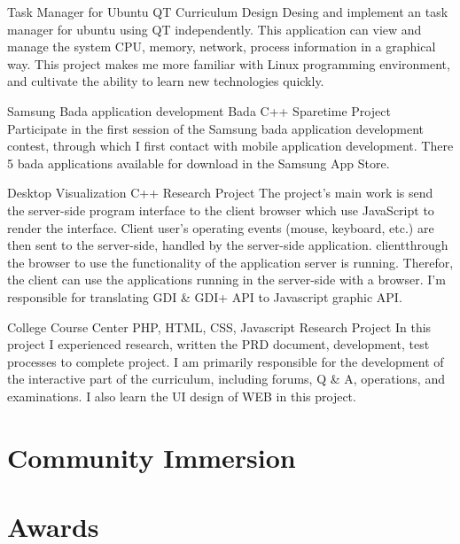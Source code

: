 \documentclass[11pt,a4paper]{moderncv}
\begin{document}
\vspace*{0.2\baselineskip}
{Task Manager for Ubuntu}
{QT}
{Curriculum Design}{}
{
Desing and implement an task manager for ubuntu using QT independently. This application can view and manage
the system CPU, memory, network, process information  in a graphical way. This project makes me more familiar
with Linux programming environment, and cultivate the ability to learn new technologies quickly.
}

\vspace*{0.2\baselineskip}
{Samsung Bada application development}
{Bada C++}
{Sparetime Project}{}
{Participate in the first session of the Samsung bada application development contest, through which I first contact with mobile
application development. There 5 bada applications available for download in the Samsung App Store.
}

\vspace*{0.2\baselineskip}
{Desktop Visualization}
{C++}
{Research Project}{}
{The project's main work is send the server-side program interface to the client browser which use JavaScript to render the interface. 
Client user's operating events (mouse, keyboard, etc.) are then sent to the server-side, handled by the server-side application.
clientthrough the browser to use the functionality of the application server is running. Therefor, the client can use the
applications running in the server-side with a browser. I'm responsible for translating GDI \& GDI+ API to Javascript graphic API.
}

\vspace*{0.2\baselineskip}
{College Course Center}
{PHP, HTML, CSS, Javascript}
{Research Project}{}
{
In this project I experienced research, written the PRD document, development, test processes to complete project. 
I am primarily responsible for the development of the interactive part of the curriculum, including forums, Q \& A,
operations, and examinations. I also learn the UI design of WEB in this project.
}


\section{Community Immersion}

\section{Awards}



\end{document}
